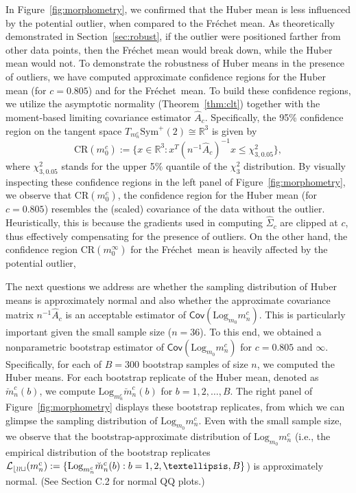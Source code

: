 \documentclass[preprint]{imsart}
\def\Frechet{Fr\'{e}chet}
\theoremstyle{plain}
\theoremstyle{remark}
\begin{document}
In Figure~\ref{fig:morphometry}, we confirmed that the Huber mean
is less influenced by the potential outlier, when compared to the Fr\'{e}chet mean. As theoretically demonstrated in Section~\ref{sec:robust}, 
if the outlier were positioned farther from other data points, then the Fr\'{e}chet mean would break down, while the Huber mean would not. To demonstrate the robustness of Huber means in the presence of outliers, we have computed approximate confidence regions for the Huber mean (for $c = 0.805$) and for the \Frechet\ mean. To build these confidence regions, we utilize the asymptotic normality (Theorem~\ref{thm:clt}) together with the moment-based limiting covariance estimator $\hat{A}_c$. %
Specifically, the 95\% confidence region on the tangent space $T_{m^{c}_n}\mbox{Sym}^+(2) \cong \mathbb{R}^3$ is given by 
\begin{equation}
    \label{eq:CR}\mbox{CR}(m_0^c) := \{x \in \mathbb{R}^3: x^{T} (n^{-1}\hat{A}_c)^{-1} x \le \chi^{2}_{3, 0.05}\},
\end{equation} 
where $\chi^{2}_{3, 0.05}$ stands for the upper 5$\%$ quantile of the $\chi^{2}_{3}$ distribution. 
By visually inspecting these confidence regions in the left panel of Figure~\ref{fig:morphometry}, we observe that $\mbox{CR}(m_0^c)$, the confidence region for the Huber mean (for $c = 0.805$) resembles the (scaled) covariance of the data without the outlier. Heuristically, this is because the gradients used in computing $\hat\Sigma_{c}$ are clipped at $c$, thus effectively compensating for the presence of outliers. On the other hand, the confidence region $\mbox{CR}(m_0^\infty)$ for the \Frechet\ mean  is heavily affected by the potential outlier, 


The next questions we address are whether the sampling distribution of Huber means is approximately normal and also whether the approximate covariance matrix $n^{-1}\hat{A}_c$ is an acceptable estimator of $\textsf{Cov}(\mbox{Log}_{m_0}m_n^c)$. This is particularly important given the small sample size ($n = 36$). To this end, we obtained a nonparametric bootstrap estimator of $\textsf{Cov}(\mbox{Log}_{m_0}m_n^c)$ for $c = 0.805$ and $\infty$. Specifically, for each of $B = 300$ bootstrap samples of size $n$, we computed the Huber means. For each bootstrap replicate of the Huber mean, denoted as $\breve{m}_n^{c}(b)$, we compute  $\mbox{Log}_{m_n^c} \breve{m}_n^{c}(b)$ for $b = 1, 2, \ldots, B$. The right panel of Figure~\ref{fig:morphometry} displays these bootstrap replicates, from which we can glimpse the sampling distribution of $\mbox{Log}_{m_0}m_n^c$. Even with the small sample size, we observe that the bootstrap-approximate distribution of $\mbox{Log}_{m_0}m_n^c$ (i.e., the empirical distribution of the bootstrap replicates  $\mathcal{L_{\rm boot}}(m_n^c):= \{ \mbox{Log}_{m_n^c} \breve{m}_n^{c}(b): b= 1, 2, \ldots, B\}$) is approximately normal. (See Section C.2 for normal QQ plots.)
\end{document}
